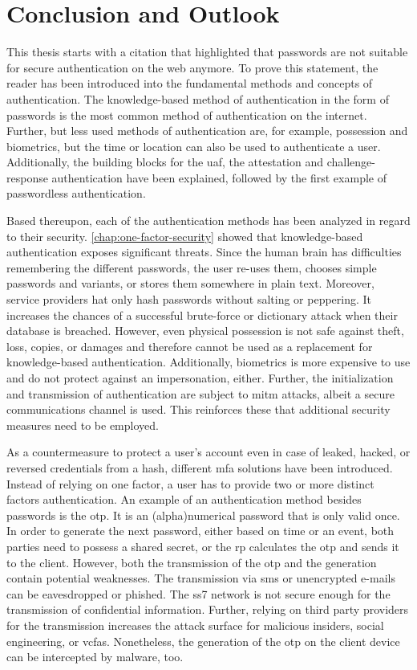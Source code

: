 \chapter{Conclusion and Outlook}

This thesis starts with a citation that highlighted that passwords are not suitable for secure authentication on the web anymore. To prove this statement, the reader has been introduced into the fundamental methods and concepts of authentication. The knowledge-based method of authentication in the form of passwords is the most common method of authentication on the internet. Further, but less used methods of authentication are, for example, possession and biometrics, but the time or location can also be used to authenticate a user. Additionally, the building blocks for the \gls{uaf}, the attestation and challenge-response authentication have been explained, followed by the first example of passwordless authentication.

Based thereupon, each of the authentication methods has been analyzed in regard to their security. \autoref{chap:one-factor-security} showed that knowledge-based authentication exposes significant threats. Since the human brain has difficulties remembering the different passwords, the user re-uses them, chooses simple passwords and variants, or stores them somewhere in plain text. Moreover, service providers hat only hash passwords without salting or peppering. It increases the chances of a successful brute-force or dictionary attack when their database is breached. However, even physical possession is not safe against theft, loss, copies, or damages and therefore cannot be used as a replacement for knowledge-based authentication. Additionally, biometrics is more expensive to use and do not protect against an impersonation, either. Further, the initialization and transmission of authentication are subject to \gls{mitm} attacks, albeit a secure communications channel is used. This reinforces these that additional security measures need to be employed.

As a countermeasure to protect a user's account even in case of leaked, hacked, or reversed credentials from a hash, different \gls{mfa} solutions have been introduced. Instead of relying on one factor, a user has to provide two or more distinct factors authentication. An example of an authentication method besides passwords is the \gls{otp}. It is an (alpha)numerical password that is only valid once. In order to generate the next password, either based on time or an event, both parties need to possess a shared secret, or the \gls{rp} calculates the \gls{otp} and sends it to the client. However, both the transmission of the \gls{otp} and the generation contain potential weaknesses. The transmission via \gls{sms} or unencrypted e-mails can be eavesdropped or phished. The \gls{ss7} network is not secure enough for the transmission of confidential information. Further, relying on third party providers for the transmission increases the attack surface for malicious insiders, social engineering, or \glspl{vcfa}. Nonetheless, the generation of the \gls{otp} on the client device can be intercepted by malware, too.

